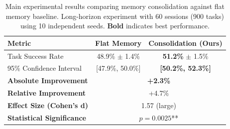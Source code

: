 
\begin{table}[t]
\centering
\caption{Main experimental results comparing memory consolidation against flat memory baseline.
Long-horizon experiment with 60 sessions (900 tasks) using 10 independent seeds.
\textbf{Bold} indicates best performance.}
\label{tab:main_results}
\begin{tabular}{@{}lcc@{}}
\toprule
Metric & Flat Memory & Consolidation (Ours) \\
\midrule
Task Success Rate & 48.9\% $\pm$ 1.4\% & \textbf{51.2\%} $\pm$ 1.5\% \\
95\% Confidence Interval & [47.9\%, 50.0\%] & \textbf{[50.2\%, 52.3\%]} \\
\midrule
\textbf{Absolute Improvement} & \multicolumn{2}{c}{\textbf{+2.3\%}} \\
\textbf{Relative Improvement} & \multicolumn{2}{c}{+4.7\%} \\
\textbf{Effect Size (Cohen's d)} & \multicolumn{2}{c}{1.57 (large)} \\
\textbf{Statistical Significance} & \multicolumn{2}{c}{$p = 0.0025$**} \\
\bottomrule
\end{tabular}
\end{table}
